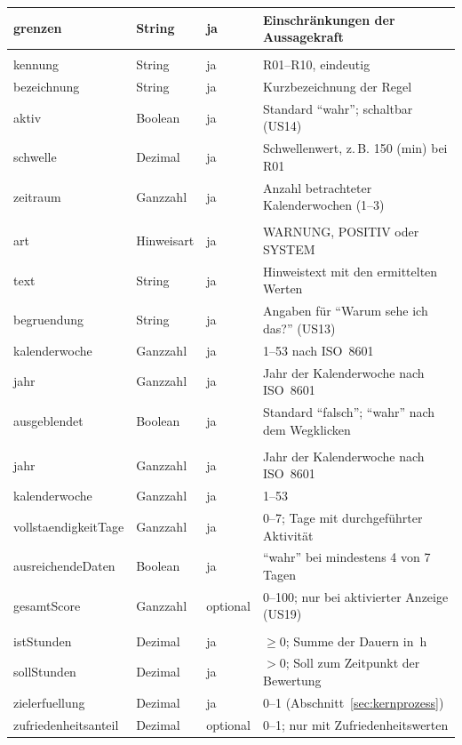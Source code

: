\begin{longtable}{@{}>{}L{3.8cm}L{2.8cm}L{1.5cm}L{7.1cm}@{}}
  grenzen & String & ja & Einschränkungen der Aussagekraft \\
  \midrule
   \\*
  kennung & String & ja & R01--R10, eindeutig \\
  bezeichnung & String & ja & Kurzbezeichnung der Regel \\
  aktiv & Boolean & ja & Standard \enquote{wahr}; schaltbar (US14) \\
  schwelle & Dezimal & ja & Schwellenwert, z.\,B. 150 (min) bei R01 \\
  zeitraum & Ganzzahl & ja & Anzahl betrachteter Kalenderwochen (1--3) \\
  \midrule
   \\*
  art & Hinweisart & ja & WARNUNG, POSITIV oder SYSTEM \\
  text & String & ja & Hinweistext mit den ermittelten Werten \\
  begruendung & String & ja & Angaben für \enquote{Warum sehe ich das?} (US13) \\
  kalenderwoche & Ganzzahl & ja & 1--53 nach ISO~8601 \\
  jahr & Ganzzahl & ja & Jahr der Kalenderwoche nach ISO~8601 \\
  ausgeblendet & Boolean & ja & Standard \enquote{falsch}; \enquote{wahr} nach dem Wegklicken \\
  \midrule
   \\*
  jahr & Ganzzahl & ja & Jahr der Kalenderwoche nach ISO~8601 \\
  kalenderwoche & Ganzzahl & ja & 1--53 \\
  vollstaendigkeitTage & Ganzzahl & ja & 0--7; Tage mit durchgeführter Aktivität \\
  ausreichendeDaten & Boolean & ja & \enquote{wahr} bei mindestens 4 von 7 Tagen \\
  gesamtScore & Ganzzahl & optional & 0--100; nur bei aktivierter Anzeige (US19) \\
  \midrule
   \\*
  istStunden & Dezimal & ja & $\geq 0$; Summe der Dauern in~h \\
  sollStunden & Dezimal & ja & $> 0$; Soll zum Zeitpunkt der Bewertung \\
  zielerfuellung & Dezimal & ja & 0--1 (Abschnitt~\ref{sec:kernprozess}) \\
  zufriedenheitsanteil & Dezimal & optional & 0--1; nur mit Zufriedenheitswerten \\

\end{longtable}
